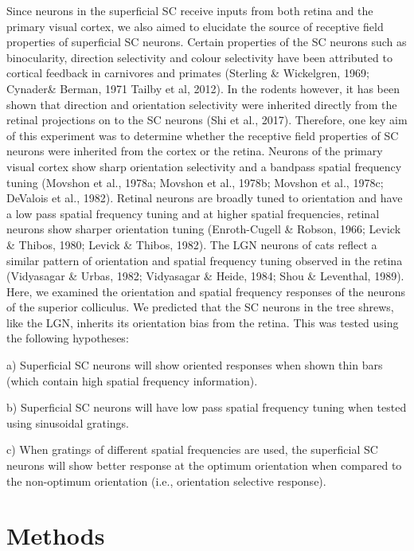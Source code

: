 	Since neurons in the superficial SC receive inputs from both retina and the primary visual cortex, we also aimed to elucidate the source of receptive field properties of superficial SC neurons. Certain properties of the SC neurons such as binocularity, direction selectivity and colour selectivity have been attributed to cortical feedback in carnivores and primates (Sterling \& Wickelgren, 1969; Cynader\& Berman, 1971 Tailby et al, 2012). In the rodents however, it has been shown that direction and orientation selectivity were inherited directly from the retinal projections on to the SC neurons (Shi et al., 2017). Therefore, one key aim of this experiment was to determine whether the receptive field properties of SC neurons were inherited from the cortex or the retina. Neurons of the primary visual cortex show sharp orientation selectivity and a bandpass spatial frequency tuning (Movshon et al., 1978a; Movshon et al., 1978b; Movshon et al., 1978c; DeValois et al., 1982). Retinal neurons are broadly tuned to orientation and have a low pass spatial frequency tuning and at higher spatial frequencies, retinal neurons show sharper orientation tuning (Enroth-Cugell \& Robson, 1966; Levick \& Thibos, 1980; Levick \& Thibos, 1982). The LGN neurons of cats reflect a similar pattern of orientation and spatial frequency tuning observed in the retina (Vidyasagar \& Urbas, 1982; Vidyasagar \& Heide, 1984; Shou \& Leventhal, 1989). Here, we examined the orientation and spatial frequency responses of the neurons of the superior colliculus. We predicted that the SC neurons in the tree shrews, like the LGN, inherits its orientation bias from the retina. This was tested using the following hypotheses:
	
	a) Superficial SC neurons will show oriented responses when shown thin bars (which contain high spatial frequency information).
	
	b) Superficial SC neurons will have low pass spatial frequency tuning when tested using sinusoidal gratings.
	
	c) When gratings of different spatial frequencies are used, the superficial SC neurons will show better response at the optimum orientation when compared to the non-optimum orientation (i.e., orientation selective response).
	
	\section{Methods}

